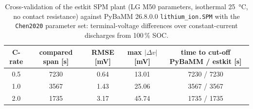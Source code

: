 \begin{table}[H]\centering\footnotesize\setlength{\tabcolsep}{4pt}\caption{Cross-validation of the estkit SPM plant (LG M50 parameters, isothermal \SI{25}{\celsius}, no contact resistance) against PyBaMM 26.8.0.0 \texttt{lithium\_ion.SPM} with the \texttt{Chen2020} parameter set: terminal-voltage differences over constant-current discharges from 100\,\% SOC.}\label{tab:val_pybamm}
\begin{tabular}{ccccc}\toprule C-rate & compared span [s] & RMSE [mV] & max $|\Delta v|$ [mV] & time to cut-off PyBaMM / estkit [s] \\ \midrule
0.5 & 7230 & 0.64 & 13.01 & 7230 / 7230 \\
1.0 & 3567 & 1.43 & 25.06 & 3567 / 3567 \\
2.0 & 1735 & 3.17 & 45.74 & 1735 / 1735 \\
\bottomrule\end{tabular}\end{table}
